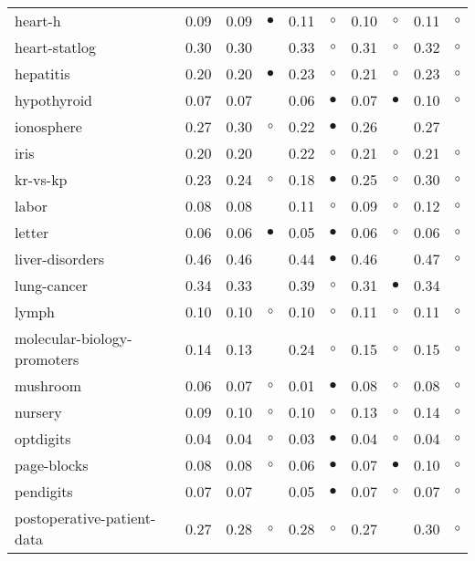 {\begin{longtable}{lrr@{\hspace{0.1cm}}cr@{\hspace{0.1cm}}cr@{\hspace{0.1cm}}cr@{\hspace{0.1cm}}c}
heart-h & 0.09 & 0.09 &  $\bullet$ & 0.11 &   $\circ$ & 0.10 &   $\circ$ & 0.11 &   $\circ$\\
heart-statlog & 0.30 & 0.30 &            & 0.33 &   $\circ$ & 0.31 &   $\circ$ & 0.32 &   $\circ$\\
hepatitis & 0.20 & 0.20 &  $\bullet$ & 0.23 &   $\circ$ & 0.21 &   $\circ$ & 0.23 &   $\circ$\\
hypothyroid & 0.07 & 0.07 &            & 0.06 & $\bullet$ & 0.07 & $\bullet$ & 0.10 &   $\circ$\\
ionosphere & 0.27 & 0.30 &    $\circ$ & 0.22 & $\bullet$ & 0.26 &           & 0.27 &          \\
iris & 0.20 & 0.20 &            & 0.22 &   $\circ$ & 0.21 &   $\circ$ & 0.21 &   $\circ$\\
kr-vs-kp & 0.23 & 0.24 &    $\circ$ & 0.18 & $\bullet$ & 0.25 &   $\circ$ & 0.30 &   $\circ$\\
labor & 0.08 & 0.08 &            & 0.11 &   $\circ$ & 0.09 &   $\circ$ & 0.12 &   $\circ$\\
letter & 0.06 & 0.06 &  $\bullet$ & 0.05 & $\bullet$ & 0.06 &   $\circ$ & 0.06 &   $\circ$\\
liver-disorders & 0.46 & 0.46 &            & 0.44 & $\bullet$ & 0.46 &           & 0.47 &   $\circ$\\
lung-cancer & 0.34 & 0.33 &            & 0.39 &   $\circ$ & 0.31 & $\bullet$ & 0.34 &          \\
lymph & 0.10 & 0.10 &    $\circ$ & 0.10 &   $\circ$ & 0.11 &   $\circ$ & 0.11 &   $\circ$\\
molecular-biology-promoters & 0.14 & 0.13 &            & 0.24 &   $\circ$ & 0.15 &   $\circ$ & 0.15 &   $\circ$\\
mushroom & 0.06 & 0.07 &    $\circ$ & 0.01 & $\bullet$ & 0.08 &   $\circ$ & 0.08 &   $\circ$\\
nursery & 0.09 & 0.10 &    $\circ$ & 0.10 &   $\circ$ & 0.13 &   $\circ$ & 0.14 &   $\circ$\\
optdigits & 0.04 & 0.04 &    $\circ$ & 0.03 & $\bullet$ & 0.04 &   $\circ$ & 0.04 &   $\circ$\\
page-blocks & 0.08 & 0.08 &    $\circ$ & 0.06 & $\bullet$ & 0.07 & $\bullet$ & 0.10 &   $\circ$\\
pendigits & 0.07 & 0.07 &            & 0.05 & $\bullet$ & 0.07 &   $\circ$ & 0.07 &   $\circ$\\
postoperative-patient-data & 0.27 & 0.28 &    $\circ$ & 0.28 &   $\circ$ & 0.27 &           & 0.30 &   $\circ$\\

\end{longtable}}
